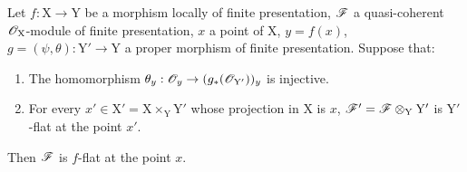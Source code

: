 \begin{proposition}[11.5.3]
\label{IV.11.5.3}
Let $f:\mathrm{X}\to\mathrm{Y}$ be a morphism locally of finite presentation,
$\mathscr{F}$ a quasi-coherent $\mathscr{O}_\mathrm{X}$-module of finite presentation, $x$ a point of $\mathrm{X}$, $y=f(x)$, $g=(\psi,\theta):\mathrm{Y}'\to\mathrm{Y}$
a \textup{proper} morphism of finite presentation. Suppose that:
\begin{enumerate}[label=\textup{(\roman*)}]
  \item The homomorphism $\theta_y:\mathscr{O}_y\to(g_*(\mathscr{O}_{\mathrm{Y}'}))_y$ is injective.
  \item For every $x'\in\mathrm{X}'=\mathrm{X}\times_\mathrm{Y}\mathrm{Y}'$ whose projection in $\mathrm{X}$ is $x$, $\mathscr{F}'=\mathscr{F}\otimes_\mathrm{Y}\mathrm{Y}'$ is
  $\mathrm{Y}'$-flat at the point $x'$.
\end{enumerate}

Then $\mathscr{F}$ is $f$-flat at the point $x$.
\end{proposition}

